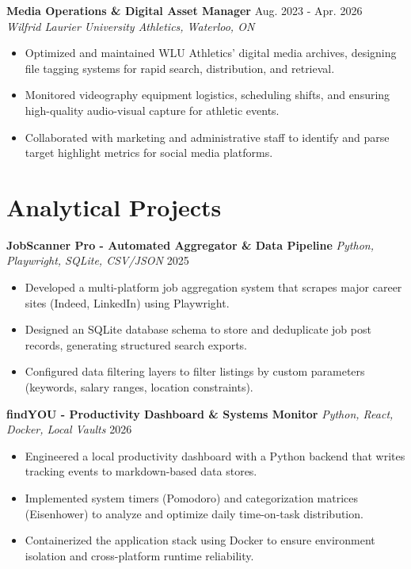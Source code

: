 \documentclass[a4paper,10pt]{article}
\begin{document}
\vspace{3pt}
\textbf{Media Operations & Digital Asset Manager} \hfill Aug. 2023 - Apr. 2026 \\
\textit{Wilfrid Laurier University Athletics, Waterloo, ON}
\begin{itemize}
    \item Optimized and maintained WLU Athletics' digital media archives, designing file tagging systems for rapid search, distribution, and retrieval.
    \item Monitored videography equipment logistics, scheduling shifts, and ensuring high-quality audio-visual capture for athletic events.
    \item Collaborated with marketing and administrative staff to identify and parse target highlight metrics for social media platforms.
\end{itemize}

\section*{Analytical Projects}
\textbf{JobScanner Pro - Automated Aggregator \& Data Pipeline} \enspace\textbar\enspace \textit{Python, Playwright, SQLite, CSV/JSON} \hfill 2025 \\
\begin{itemize}
    \item Developed a multi-platform job aggregation system that scrapes major career sites (Indeed, LinkedIn) using Playwright.
    \item Designed an SQLite database schema to store and deduplicate job post records, generating structured search exports.
    \item Configured data filtering layers to filter listings by custom parameters (keywords, salary ranges, location constraints).
\end{itemize}

\vspace{3pt}
\textbf{findYOU - Productivity Dashboard \& Systems Monitor} \enspace\textbar\enspace \textit{Python, React, Docker, Local Vaults} \hfill 2026 \\
\begin{itemize}
    \item Engineered a local productivity dashboard with a Python backend that writes tracking events to markdown-based data stores.
    \item Implemented system timers (Pomodoro) and categorization matrices (Eisenhower) to analyze and optimize daily time-on-task distribution.
    \item Containerized the application stack using Docker to ensure environment isolation and cross-platform runtime reliability.
\end{itemize}
\end{document}
